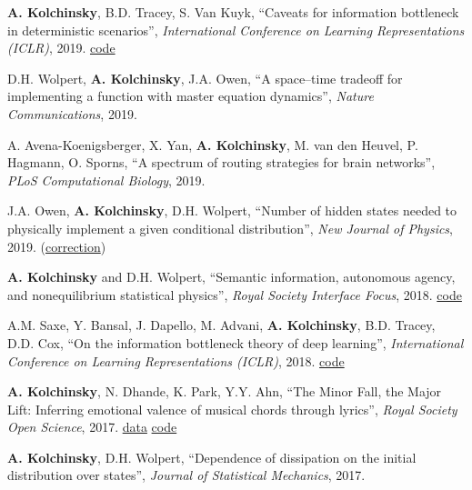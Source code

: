 \textbf{A. Kolchinsky}, B.D. Tracey, S. Van Kuyk, ``Caveats for information bottleneck in deterministic scenarios'', \emph{International Conference on Learning Representations (ICLR)}, 2019. 
\href{https://github.com/artemyk/ibcurve}{code}

D.H. Wolpert, \textbf{A. Kolchinsky}, J.A. Owen, ``A space–time tradeoff for implementing a function with master equation dynamics'', \emph{Nature Communications}, 2019. 

A. Avena-Koenigsberger, X. Yan, \textbf{A. Kolchinsky}, M. van den Heuvel, P. Hagmann, O. Sporns, 
``A spectrum of routing strategies for brain networks'', \emph{PLoS Computational Biology}, 2019. 

J.A. Owen, \textbf{A. Kolchinsky}, D.H. Wolpert, ``Number of hidden states needed to physically implement a given conditional distribution'', \emph{New Journal of Physics}, 2019. (\href{https://iopscience.iop.org/article/10.1088/1367-2630/ab60f8}{correction}) 

\textbf{A. Kolchinsky} and D.H. Wolpert, 
``Semantic information, autonomous agency, and nonequilibrium statistical physics'', 
\emph{Royal Society Interface Focus}, 2018. 
\href{https://github.com/artemyk/semantic_information/}{code}

A.M. Saxe, Y. Bansal, J. Dapello, M. Advani, \textbf{A. Kolchinsky}, B.D. Tracey, D.D. Cox, 
``On the information bottleneck theory of deep learning'', \emph{International Conference on Learning Representations (ICLR)}, 2018. 
 \href{https://github.com/artemyk/ibsgd/tree/iclr2018}{code}

\textbf{A. Kolchinsky}, N. Dhande, K. Park, Y.Y. Ahn, ``The Minor Fall, the Major Lift: Inferring emotional valence of musical chords through lyrics'', \emph{Royal Society Open Science}, 2017. 
\href{https://doi.org/10.6084/m9.figshare.5413060.v1.}{data} 
\href{https://github.com/artemyk/chordsentiment}{code}

\textbf{A. Kolchinsky}, D.H. Wolpert, ``Dependence of dissipation on the initial distribution over states'',
\emph{Journal of Statistical Mechanics}, 2017. 

